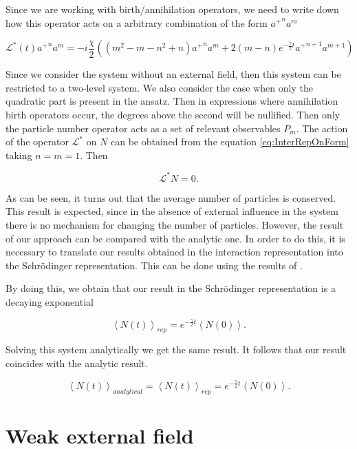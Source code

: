 \documentclass[12pt]{article}
\theoremstyle{definition}
\newcommand\bra{\left<}
\newcommand\ket{\right>}
\newcommand{\braket}[1]{\bra#1\ket}
\def\ga {\gamma}
\begin{document}
	Since we are working with birth/annihilation operators, we need to write down how this operator acts on a arbitrary combination of the form ${a^+}^na^m$
	
	\begin{equation}
		\label{eq:InterRepOnForm}
		\mathcal{L}^*(t){a^+}^na^m = -i\frac{\chi}{2}((m^2 - m - n^2 + n){a^+}^na^m + 2 (m - n) e^{-\frac{\ga}{2}t} {a^+}^{n + 1} a^{m + 1})
	\end{equation}
	
	Since we consider the system without an external field, then this system can be restricted to a two-level system. We also consider the case when only the quadratic part is present in the ansatz. Then in expressions where annihilation birth operators occur, the degrees above the second will be nullified. Then only the particle number operator acts as a set of relevant observables $P_m$. The action of the operator $\mathcal{L}^*$ on $N$ can be obtained from the equation \ref{eq:InterRepOnForm} taking $n = m = 1$. Then
	
	\begin{equation*}
		\mathcal{L}^*N = 0.
	\end{equation*}

	As can be seen, it turns out that the average number of particles is conserved. This result is expected, since in the absence of external influence in the system there is no mechanism for changing the number of particles. However, the result of our approach can be compared with the analytic one. In order to do this, it is necessary to translate our results obtained in the interaction representation into the Schrödinger representation. This can be done using the results of \cite{Dis}.
	
	By doing this, we obtain that our result in the Schrödinger representation is a decaying exponential
	
	 \begin{equation*}
	 	\braket{N(t)}_{rep} = e^{-\frac{\ga}{2}t}\braket{N(0)}.
	 \end{equation*}
	 
	 Solving this system analytically we get the same result. It follows that our result coincides with the analytic result.
	 
	 \begin{equation*}
	 	\braket{N(t)}_{analytical } = \braket{N(t)}_{rep} = e^{-\frac{\ga}{2}t}\braket{N(0)}.
	 \end{equation*}

	\section{Weak external field\label{sec:Efc}}
	
\end{document}
